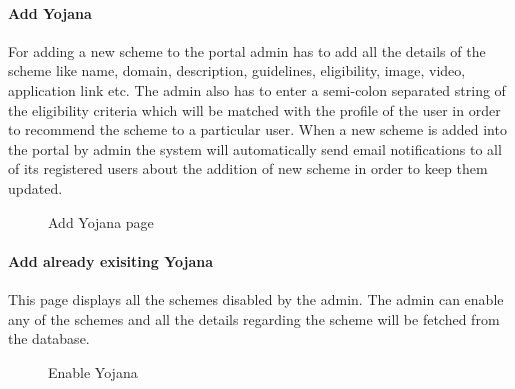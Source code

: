 \documentclass[conference]{IEEEtran}
\begin{document}
\paragraph{Add Yojana}
For adding a new scheme to the portal admin has to add all the details of the scheme like name, domain, description, guidelines, eligibility, image, video, application link etc. The admin also has to enter a semi-colon separated string of the eligibility criteria which will be matched with the profile of the user in order to recommend the scheme to a particular user. When a new scheme is added into the portal by admin the system will automatically send email notifications to all of its registered users about the addition of new scheme in order to keep them updated.
\begin{figure}[h!]
\centering
{}
\caption{Add Yojana page}
\end{figure}
\paragraph{Add already exisiting Yojana}
This page displays all the schemes disabled by the admin. The admin can enable any of the schemes and all the details regarding the scheme will be fetched from the database.
\begin{figure}[h!]
\centering
{}
\caption{Enable Yojana}
\end{figure}
\end{document}

